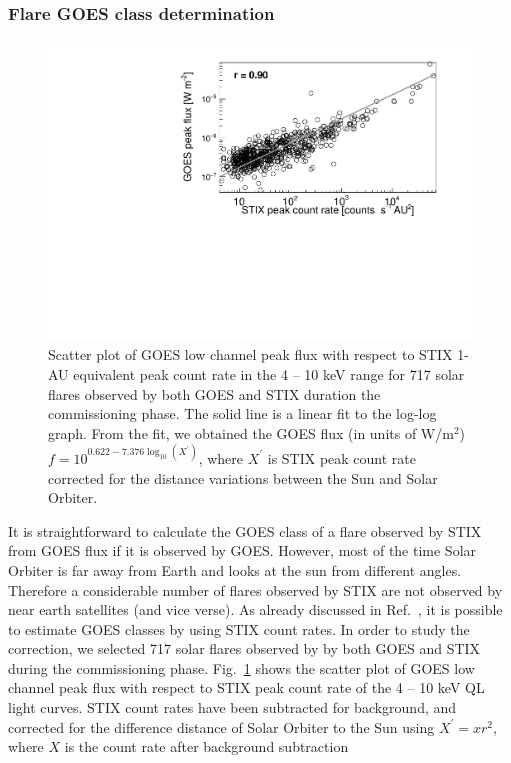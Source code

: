 \documentclass{aa}
\begin{document}
\subsubsection{Flare GOES class determination}
\begin{figure}
  \centering
  \includegraphics[width=0.8\linewidth]{figures/goes_stix_flux_paper.pdf}
  \caption{Scatter plot of GOES low channel peak flux with respect to STIX 1-AU equivalent  peak count rate in the 4 -- 10 keV range
  for 717 solar flares observed by both GOES and STIX duration the commissioning phase. 
  The solid line is a linear fit to the log-log graph. 
From the fit, we obtained 
the GOES flux (in units of W/m$^2$) $f = 10^{0.622 -7.376 \log_{10} (X^{'})}$,
where $X^{'}$ is STIX peak count rate corrected for the distance variations between the Sun and Solar Orbiter. 
}
\label{fig:goes-stix}
\end{figure}
It is straightforward to calculate the GOES
class of a flare observed by STIX from GOES flux if it is observed by GOES. 
However,  most of the time Solar Orbiter is far away from Earth and looks at 
the sun from different angles. Therefore a considerable number of flares observed by STIX
 are not observed by near earth satellites (and vice verse). 
As already discussed in Ref.~\cite{andrea2021}, 
it is possible to estimate GOES classes by using STIX count rates.
In order to study the correction, we selected 717 solar flares observed by 
by both GOES  and   STIX during the commissioning phase.   
Fig.~\ref{fig:goes-stix} shows the scatter plot of GOES low channel peak flux with respect to 
STIX peak count rate  of the 4 -- 10 keV QL light curves. 
STIX count rates  have been subtracted for background,  and corrected for 
the difference distance of Solar Orbiter to the Sun using $X^{'}=x r^2$, where $X$ is the count rate after background subtraction
\end{document}
